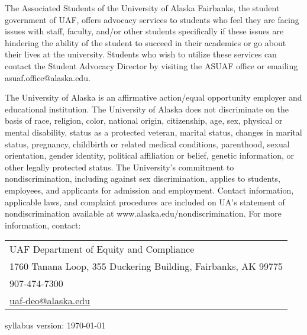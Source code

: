 \documentclass[12pt]{article}
\def\mailto#1{\href{mailto:#1}{#1}}
\begin{document}
 The Associated Students of the University of Alaska Fairbanks, the student government of UAF, offers advocacy services to students who feel they are facing issues with staff, faculty, and/or other students specifically if these issues are hindering the ability of the student to succeed in their academics or go about their lives at the university. Students who wish to utilize these services can contact the Student Advocacy Director by visiting the ASUAF office or emailing asuaf.office@alaska.edu.

The University of Alaska is an affirmative action/equal opportunity employer and educational institution. The University of Alaska does not discriminate on the basis of race, religion, color, national origin, citizenship, age, sex, physical or mental disability, status as a protected veteran, marital status, changes in marital status, pregnancy, childbirth or related medical conditions, parenthood, sexual orientation, gender identity, political affiliation or belief, genetic information, or other legally protected status. The University's commitment to nondiscrimination, including against sex discrimination, applies to students, employees, and applicants for admission and employment. Contact information, applicable laws, and complaint procedures are included on UA's statement of nondiscrimination available at www.alaska.edu/nondiscrimination. For more information, contact:

\begin{tabular}{l}
UAF Department of Equity and Compliance\\
1760 Tanana Loop, 355 Duckering Building, Fairbanks, AK  99775\\
907-474-7300\\
\mailto{uaf-deo@alaska.edu}
\end{tabular}

 \scriptsize syllabus version: \today \normalsize
\end{document}

